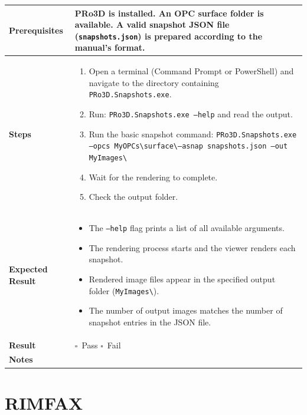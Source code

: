 \documentclass[a4paper,11pt]{article}
\newcommand{\checkbox}{$\square$}
\begin{document}
	\begin{tabularx}{\textwidth}{lX}
		\toprule
		\textbf{Prerequisites} & PRo3D is installed. An OPC surface folder is available. A valid snapshot JSON file (\texttt{snapshots.json}) is prepared according to the manual's format. \\
		\midrule
		\textbf{Steps} &
		\begin{enumerate}[leftmargin=*, nosep]
			\item Open a terminal (Command Prompt or PowerShell) and navigate to the directory containing \texttt{PRo3D.Snapshots.exe}.
			\item Run: \texttt{PRo3D.Snapshots.exe --help} and read the output.
			\item Run the basic snapshot command: \texttt{PRo3D.Snapshots.exe --opcs MyOPCs\textbackslash surface\textbackslash  --asnap snapshots.json --out MyImages\textbackslash }
			\item Wait for the rendering to complete.
			\item Check the output folder.
		\end{enumerate} \\
		\midrule
		\textbf{Expected Result} &
		\begin{itemize}[leftmargin=*, nosep]
			\item The \texttt{--help} flag prints a list of all available arguments.
			\item The rendering process starts and the viewer renders each snapshot.
			\item Rendered image files appear in the specified output folder (\texttt{MyImages\textbackslash}).
			\item The number of output images matches the number of snapshot entries in the JSON file.
		\end{itemize} \\
		\midrule
		\textbf{Result} & \checkbox~Pass \quad \checkbox~Fail \\
		\midrule
		\textbf{Notes} & \\[1.5cm]
		\bottomrule
	\end{tabularx}
	
	\newpage
	\section{RIMFAX}
	
\end{document}
